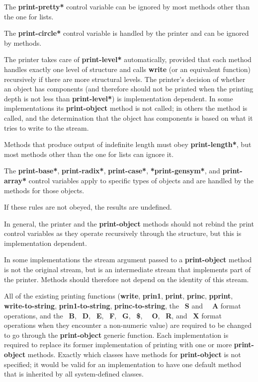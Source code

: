 \item{\bull} 
The {\bf *print-pretty*} control variable can be ignored
by most methods other than the one for lists.

\item{\bull}
The {\bf *print-circle*} control variable is handled by the printer
and can be ignored by methods.

\item{\bull}
The printer takes care of {\bf *print-level*} automatically, provided that
each method handles exactly one level of structure and
calls {\bf write} (or an equivalent function) recursively if
there are more structural levels.  The printer's decision
of whether an object has components (and therefore should
not be printed when the printing depth is not less than
{\bf *print-level*}) is implementation dependent.  In some
implementations its {\bf print-object} method is not called; in
others the method is called, and the determination that the
object has components is based on what it tries to write
to the stream.

\item{\bull}
Methods that produce output of indefinite length must obey
{\bf *print-length*}, but most methods other than the one for lists can
ignore it.

\item{\bull}
The {\bf *print-base*}, {\bf *print-radix*}, {\bf *print-case*}, {\bf
*print-gensym*}, and {\bf *print-array*} control variables apply
to specific types of objects and are handled by the methods for those
objects.

\endlist

If these rules are not obeyed, the results are undefined.

In general, the printer and the {\bf print-object} methods should not
rebind the print control variables as they operate recursively through the
structure, but this is implementation dependent.

In some implementations the stream argument passed to a {\bf
print-object} method is not the original stream, but is an
intermediate stream that implements part of the printer.  Methods
should therefore not depend on the identity of this stream.

All of the existing printing functions ({\bf write}, {\bf prin1}, {\bf
print}, {\bf princ}, {\bf pprint}, {\bf write-to-string}, {\bf
prin1-to-string}, {\bf princ-to-string}, the {\tt ~}{\bf S} and {\tt
~}{\bf A} format operations, and the {\tt ~}{\bf B}, {\tt ~}{\bf D},
{\tt ~}{\bf E}, {\tt ~}{\bf F}, {\tt ~}{\bf G}, {\tt ~}{\bf \$}, {\tt
~}{\bf O}, {\tt ~}{\bf R}, and {\tt ~}{\bf X} format operations when they
encounter a non-numeric value) are required to be changed to go
through the {\bf print-object} generic function.  Each implementation is
required to replace its former implementation of printing with one or
more {\bf print-object} methods.  Exactly which classes have methods for
{\bf print-object} is not specified; it would be valid for an implementation
to have one default method that is inherited by all system-defined
classes.

